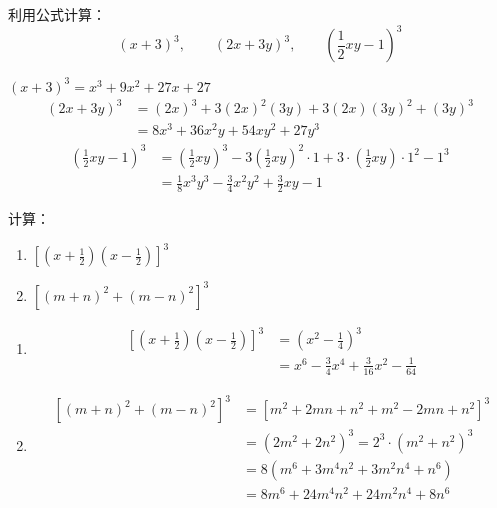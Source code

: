 \begin{example}
    利用公式计算：
\[(x+3)^3,\qquad (2x+3y)^3,\qquad \left(\frac{1}{2}xy-1\right)^3 \]
\end{example}

\begin{solution}
$(x+3)^3=x^3+9x^2+27x+27$
\[\begin{split}
    (2x+3y)^3&=(2x)^3 +3(2x)^2(3y)+3(2x)(3y)^2+(3y)^3\\
    &=8x^3+36x^2y+54xy^2+27y^3
\end{split}\]
\[\begin{split}
     \left(\frac{1}{2}xy-1\right)^3
    &= \left(\frac{1}{2}xy\right)^3 -3\left(\frac{1}{2}xy\right)^2\cdot 1+3\cdot \left(\frac{1}{2}xy\right)\cdot 1^2-1^3\\
    &=\frac{1}{8}x^3y^3-\frac{3}{4}x^2y^2+\frac{3}{2}xy-1
\end{split}\]

\end{solution}

\begin{example}
    计算：
    \begin{enumerate}
        \item $\left[\left(x+\frac{1}{2}\right)\left(x-\frac{1}{2}\right)\right]^3$
        \item $\left[(m+n)^2+(m-n)^2\right]^3$
    \end{enumerate}
\end{example}


\begin{solution}
\begin{enumerate}
    \item \[\begin{split}
        \left[\left(x+\frac{1}{2}\right)\left(x-\frac{1}{2}\right)\right]^3&=\left(x^2-\frac{1}{4}\right)^3\\
        &=x^6-\frac{3}{4}x^4+\frac{3}{16}x^2-\frac{1}{64}        
    \end{split}\]
    \item \[\begin{split}
        \left[(m+n)^2+(m-n)^2\right]^3&=\left[m^2+2mn+n^2+m^2-2mn+n^2\right]^3\\
        &=(2m^2+2n^2)^3=2^3\cdot (m^2+n^2)^3\\
        &=8(m^6+3m^4n^2+3m^2n^4+n^6)\\
        &=8m^6+24m^4n^2+24m^2n^4+8n^6
    \end{split}\]
\end{enumerate}
\end{solution}

